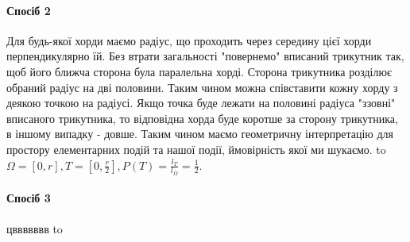 \begin{example}
    \paragraph*{Спосіб 2}
    Для будь-якої хорди маємо радіус, що проходить через середину цієї хорди 
    перпендикулярно їй. Без 
    втрати загальності "повернемо" вписаний трикутник так, щоб його ближча сторона 
    була паралельна хорді. Сторона трикутника розділює обраний радіус на дві половини. 
    Таким чином можна співставити кожну хорду з деякою точкою на радіусі. Якщо точка 
    буде лежати на половині радіуса "ззовні" вписаного трикутника, то відповідна хорда 
    буде коротше за сторону трикутника, в іншому випадку - довше. Таким чином маємо 
    геометричну інтерпретацію для простору елементарних подій та нашої події, ймовірність 
    якої ми шукаємо.
    \newline
    \hbox to 
    $\Omega = [0, r], T = [0, \frac{r}{2}], P(T) = \frac{l_T}{l_\Omega} = \frac{1}{2}$.
    \paragraph*{Спосіб 3}
    цввввввв
    \newline
    \hbox to 
\end{example}